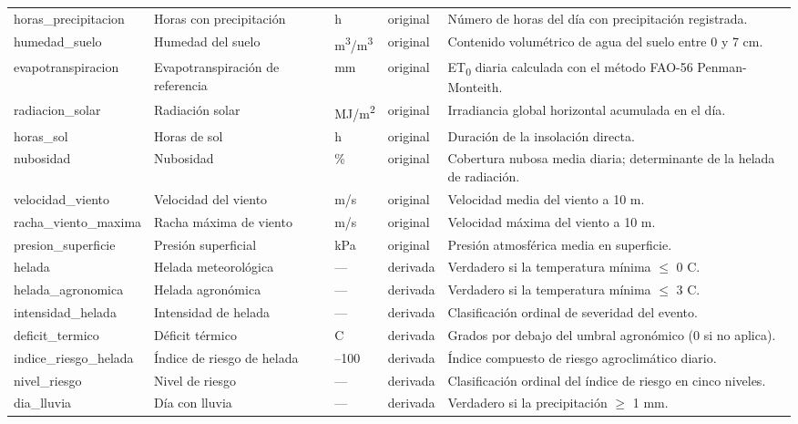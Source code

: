 \begin{longtable}{>{\raggedright\arraybackslash}p{2.8cm}>{\raggedright\arraybackslash}p{2.9cm}>{\centering\arraybackslash}p{1.2cm}>{\centering\arraybackslash}p{1.5cm}>{\raggedright\arraybackslash}p{5.5cm}}
horas\_\allowbreak{}precipitacion & Horas con precipitación & h & original & Número de horas del día con precipitación registrada. \\
humedad\_\allowbreak{}suelo & Humedad del suelo & m\textsuperscript{3}/m\textsuperscript{3} & original & Contenido volumétrico de agua del suelo entre 0 y 7 cm. \\
evapotranspiracion & Evapotranspiración de referencia & mm & original & ET\textsubscript{0} diaria calculada con el método FAO-56 Penman-Monteith. \\
radiacion\_\allowbreak{}solar & Radiación solar & MJ/m\textsuperscript{2} & original & Irradiancia global horizontal acumulada en el día. \\
horas\_\allowbreak{}sol & Horas de sol & h & original & Duración de la insolación directa. \\
nubosidad & Nubosidad & \% & original & Cobertura nubosa media diaria; determinante de la helada de radiación. \\
velocidad\_\allowbreak{}viento & Velocidad del viento & m/s & original & Velocidad media del viento a 10 m. \\
racha\_\allowbreak{}viento\_\allowbreak{}maxima & Racha máxima de viento & m/s & original & Velocidad máxima del viento a 10 m. \\
presion\_\allowbreak{}superficie & Presión superficial & kPa & original & Presión atmosférica media en superficie. \\
helada & Helada meteorológica & — & derivada & Verdadero si la temperatura mínima \ensuremath{\leq} 0 \textdegree{}C. \\
helada\_\allowbreak{}agronomica & Helada agronómica & — & derivada & Verdadero si la temperatura mínima \ensuremath{\leq} 3 \textdegree{}C. \\
intensidad\_\allowbreak{}helada & Intensidad de helada & — & derivada & Clasificación ordinal de severidad del evento. \\
deficit\_\allowbreak{}termico & Déficit térmico & \textdegree{}C & derivada & Grados por debajo del umbral agronómico (0 si no aplica). \\
indice\_\allowbreak{}riesgo\_\allowbreak{}helada & Índice de riesgo de helada & 0–100 & derivada & Índice compuesto de riesgo agroclimático diario. \\
nivel\_\allowbreak{}riesgo & Nivel de riesgo & — & derivada & Clasificación ordinal del índice de riesgo en cinco niveles. \\
dia\_\allowbreak{}lluvia & Día con lluvia & — & derivada & Verdadero si la precipitación \ensuremath{\geq} 1 mm. \\

\end{longtable}
